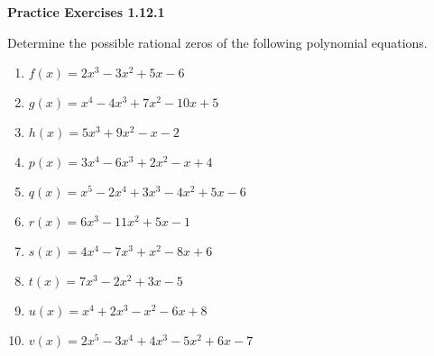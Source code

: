\vspace{0.3ex}
\noindent\textbf{Practice Exercises 1.12.1}

\vspace{0.2ex}

Determine the possible rational zeros of the following polynomial equations.
\begin{enumerate}
    \item $ f(x) = 2x^3 - 3x^2 + 5x - 6 $
    \item $ g(x) = x^4 - 4x^3 + 7x^2 - 10x + 5 $
    \item $ h(x) = 5x^3 + 9x^2 - x - 2 $
    \item $ p(x) = 3x^4 - 6x^3 + 2x^2 - x + 4 $
    \item $ q(x) = x^5 - 2x^4 + 3x^3 - 4x^2 + 5x - 6 $
    \item $ r(x) = 6x^3 - 11x^2 + 5x - 1 $
    \item $ s(x) = 4x^4 - 7x^3 + x^2 - 8x + 6 $
    \item $ t(x) = 7x^3 - 2x^2 + 3x - 5 $
    \item $ u(x) = x^4 + 2x^3 - x^2 - 6x + 8 $
    \item $ v(x) = 2x^5 - 3x^4 + 4x^3 - 5x^2 + 6x - 7 $
\end{enumerate}
